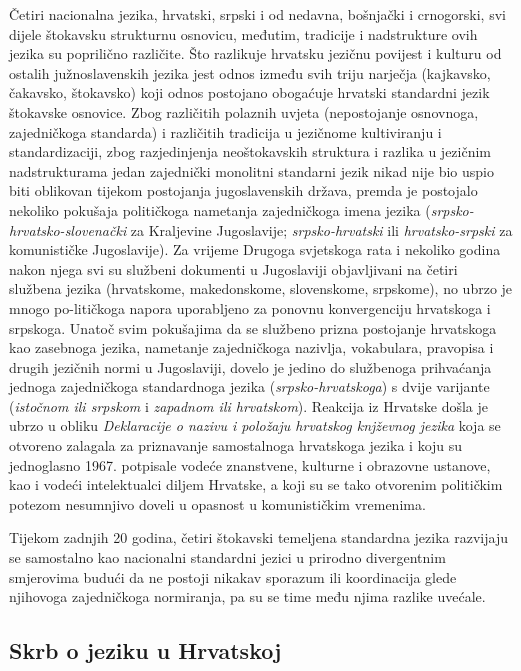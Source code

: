 \begin{multicols}{2}
Četiri nacionalna jezika, hrvatski, srpski i od nedavna, bošnjački i crnogorski, svi dijele štokavsku strukturnu osnovicu, međutim, tradicije i nadstrukture ovih jezika su poprilično različite. Što razlikuje hrvatsku jezičnu povijest i kulturu od ostalih južnoslavenskih jezika jest odnos između svih triju narječja (kajkavsko, čakavsko, štokavsko) koji odnos postojano obogaćuje hrvatski standardni jezik štokavske osnovice. Zbog različitih polaznih uvjeta (nepostojanje osnovnoga, zajedničkoga standarda) i različitih tradicija u jezičnome kultiviranju i standardizaciji, zbog razjedinjenja neoštokavskih struktura i razlika u jezičnim nadstrukturama jedan zajednički monolitni standarni jezik nikad nije bio uspio biti oblikovan tijekom postojanja jugoslavenskih država, premda je postojalo nekoliko pokušaja političkoga nametanja zajedničkoga imena jezika (\emph{srpsko-hrvatsko-slovenački} za Kraljevine Jugoslavije; \emph{srpsko-hrvatski} ili \emph{hrvatsko-srpski} za komunističke Jugoslavije). Za vrijeme Drugoga svjetskoga rata i nekoliko godina nakon njega svi su službeni dokumenti u Jugoslaviji objavljivani na četiri službena jezika (hrvatskome, makedonskome, slovenskome, srpskome), no ubrzo je mnogo po-litičkoga napora uporabljeno za ponovnu konvergenciju hrvatskoga i srpskoga. Unatoč svim pokušajima da se službeno prizna postojanje hrvatskoga kao zasebnoga jezika, nametanje zajedničkoga nazivlja, vokabulara, pravopisa i drugih jezičnih normi u Jugoslaviji, dovelo je jedino do službenoga prihvaćanja jednoga zajedničkoga standardnoga jezika (\emph{srpsko-hrvatskoga}) s dvije varijante (\emph{istočnom ili srpskom} i \emph{zapadnom ili hrvatskom}). Reakcija iz Hrvatske došla je ubrzo u obliku \emph{Deklaracije o nazivu i položaju hrvatskog knjževnog jezika} koja se otvoreno zalagala za priznavanje samostalnoga hrvatskoga jezika i koju su jednoglasno 1967. potpisale vodeće znanstvene, kulturne i obrazovne ustanove, kao i vodeći intelektualci diljem Hrvatske, a koji su se tako otvorenim političkim potezom nesumnjivo doveli u opasnost u komunističkim vremenima.

Tijekom zadnjih 20 godina, četiri štokavski temeljena standardna jezika razvijaju se samostalno kao nacionalni standardni jezici u prirodno divergentnim smjerovima budući da ne postoji nikakav sporazum ili koordinacija glede njihovoga zajedničkoga normiranja, pa su se time među njima razlike uvećale.

\subsection{Skrb o jeziku u Hrvatskoj}


\end{multicols}
